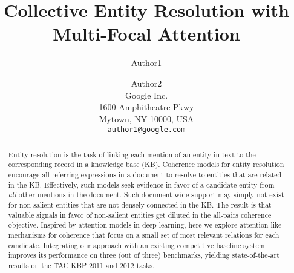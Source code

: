 \documentclass[11pt]{article}
\title{Collective Entity Resolution with Multi-Focal Attention}
\author{Author1 \and Author2\\
	    Google Inc. \\
	    1600 Amphitheatre Pkwy\\
	    Mytown, NY 10000, USA\\
	    {\tt author1@google.com}}
\date{}
\begin{document}
\maketitle

\begin{abstract}
Entity resolution is the task of linking each mention of an entity in
text to the corresponding record in a knowledge base (KB).  Coherence
models for entity resolution encourage all referring expressions in a
document to resolve to entities that are related in the KB.
Effectively, such models seek evidence in favor of a candidate entity
from \emph{all} other mentions in the document.  Such document-wide
support may simply not exist for non-salient entities that are not
densely connected in the KB.  The result is that valuable signals in
favor of non-salient entities get diluted in the all-pairs coherence
objective.  Inspired by attention models in deep learning, here we
explore attention-like mechanisms for coherence that focus on a small
set of most relevant relations for each candidate.  Integrating our
approach with an existing competitive baseline system improves its
performance on three (out of three) benchmarks, yielding
state-of-the-art results on the TAC KBP 2011 and 2012 tasks.
\end{abstract}












\begin{small}


\end{small}
\end{document}
